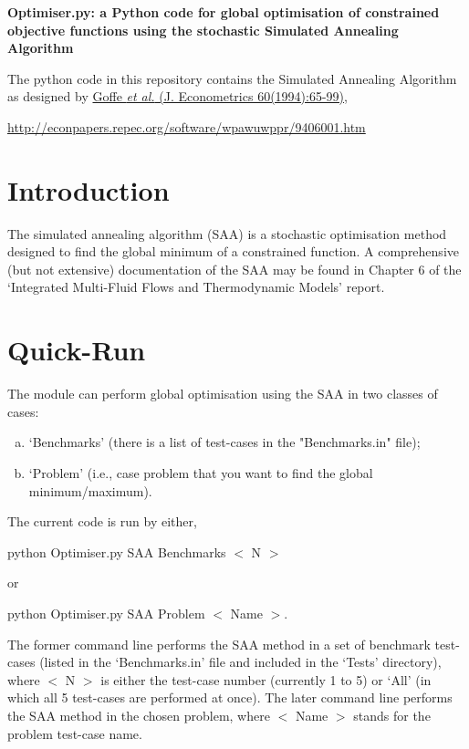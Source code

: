 \documentclass[14pt,twoside]{article}
\renewcommand {\baselinestretch}{1.5}
\begin{document}
\begin{center}
   \Large{ {\bf Optimiser.py: a Python code for global optimisation of constrained objective functions 
     using the stochastic Simulated Annealing Algorithm}}

\end{center}

\renewcommand {\baselinestretch}{1.}

   The python code in this repository contains the Simulated Annealing Algorithm as designed by \href{http://www.sciencedirect.com/science/article/pii/0304407694900388}{Goffe {\it et al.} (J. Econometrics 60(1994):65-99)}, 
\begin{center}
        \href{http://econpapers.repec.org/software/wpawuwppr/9406001.htm}{http://econpapers.repec.org/software/wpawuwppr/9406001.htm}
\end{center}


\section{Introduction}
   The simulated annealing algorithm (SAA) is a stochastic optimisation method designed to find the global minimum of a constrained function. A comprehensive (but not extensive) documentation of the SAA may be found in Chapter 6 of the `Integrated Multi-Fluid Flows and Thermodynamic Models' report. 


\section{Quick-Run}
   The module can perform global optimisation using the SAA in two classes of cases:
   \begin{enumerate}[a)]
      \item `Benchmarks' (there is a list of test-cases in the "Benchmarks.in" file);
      \item `Problem' (i.e., case problem that you want to find the global minimum/maximum).
   \end{enumerate}
   The current code is run by either,
   \begin{center}
               python Optimiser.py SAA Benchmarks $<$ N $>$
   \end{center}
   or 
   \begin{center}
               python Optimiser.py SAA Problem $<$ Name $>$.
   \end{center}
   The former command line performs the SAA method in a set of benchmark test-cases (listed in the `Benchmarks.in' file and included in the `Tests' directory), where $<$ N $>$ is either the test-case number (currently 1 to 5) or `All' (in which all 5 test-cases are performed at once). The later command line performs the SAA method in the chosen problem, where $<$ Name $>$ stands for the problem test-case name.
\end{document}
